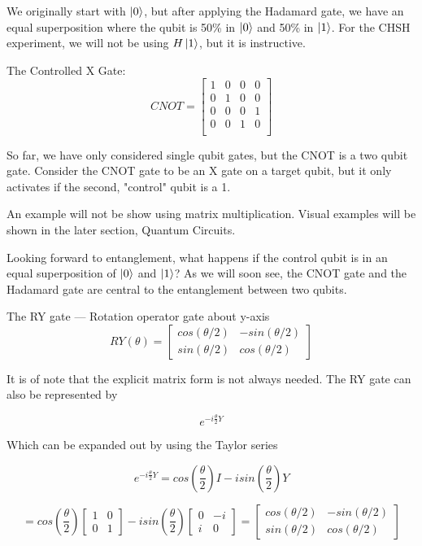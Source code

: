 \documentclass[12pt]{article}
\begin{document}
We originally start with $\ket{0}$, but after applying the Hadamard gate, we have an equal superposition where the qubit is 50\% in $\ket{0}$ and 50\% in $\ket{1}$. For the CHSH experiment, we will not be using $H\ket{1}$, but it is instructive. %


The Controlled X Gate:
$$
CNOT =
\begin{bmatrix}
1 &  0  &  0  & 0 \\
0 &  1  &  0  & 0 \\
0 &  0  &  0  & 1 \\
0 &  0  &  1  & 0 \\
\end{bmatrix}
$$

So far, we have only considered single qubit gates, but the CNOT is a two qubit gate. Consider the CNOT gate to be an X gate on a target qubit, but it only activates if the second, "control" qubit is a 1.

An example will not be show using matrix multiplication. Visual examples will be shown in the later section, Quantum Circuits. 

Looking forward to entanglement, what happens if the control qubit is in an equal superposition of $\ket{0}$ and $\ket{1}$? As we will soon see, the CNOT gate and the Hadamard gate are central to the entanglement between two qubits.

The RY gate — Rotation operator gate about y-axis 
$$
RY(\theta) =
\begin{bmatrix}
cos(\theta / 2) & -sin(\theta / 2) \\
sin(\theta / 2) &  cos(\theta / 2)
\end{bmatrix}
$$

It is of note that the explicit matrix form is not always needed. The RY gate can also be represented by 

$$
e^{-i \frac{\theta}{2} Y}
$$

Which can be expanded out by using the Taylor series

$$
e^{-i \frac{\theta}{2} Y} = cos(\frac{\theta}{2})I - isin(\frac{\theta}{2})Y
$$

$$
= cos(\frac{\theta}{2})\begin{bmatrix}
1 & 0 \\
0 &  1
\end{bmatrix} - isin(\frac{\theta}{2})\begin{bmatrix}
0 & -i \\
i &  0
\end{bmatrix} = \begin{bmatrix}
cos(\theta / 2) & -sin(\theta / 2) \\
sin(\theta / 2) &  cos(\theta / 2)
\end{bmatrix}
$$
\end{document}
